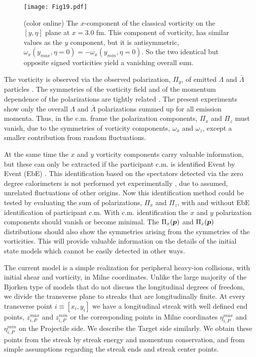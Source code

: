 \documentclass[aps,prc,twocolumn,floatfix,showpacs,a4paper,
nofootinbib,amsmath,amssymb]{revtex4-1}
\renewcommand{\vec}[1]{\mbox{\boldmath$#1$}}
\begin{document}
\begin{figure}[htb]     %
\begin{center}
\resizebox{1.01\columnwidth}{!}
{\texttt{[image: Fig19.pdf]}}
\caption{ (color online)
The $x$-component of the classical vorticity
on the $[y,\eta]$ plane at $x=3.0$ fm. This component of vorticity,
has similar values as the $y$ component, but it is 
antisymmetric, 
$\omega_x(y_{max}, \eta=0) = - \omega_x(y_{min}, \eta=0)$.
So the two identical but opposite signed vorticities
yield a vanishing overall sum.
}
\label{vort_x}
\end{center}
\end{figure}        %

The vorticity is observed via the observed polarization, $\Pi_y$, of emitted 
$\Lambda$ and $\bar{\Lambda}$ particles 
\cite{Bec13,Erratum,BCDG13}. The symmetries of the vorticity field and
of the momentum dependence of the polarizations are tightly
related \cite{BCDG13}. The present experiments show only the overall
$\Lambda$ and $\bar{\Lambda}$ polarizations summed up for all emission
momenta. Thus, in the c.m. frame the polarization components,
$\Pi_x$  and $\Pi_z$ must vanish, 
due to the symmetries of vorticity components,
$\omega_x$ and $\omega_z$,
except a smaller contribution from random fluctuations.

At the same time the $x$ and $y$ vorticity components carry valuable
information, but these can only be extracted if the participant 
c.m. is identified Event by Event (EbE)
\cite{Eyyubova,CseStoe2014}.
This identification based on the spectators detected via the
zero degree calorimeters is not performed yet experimentally
\cite{Schukraft},
due to assumed, unrelated fluctuations of other origins.
Now this identification method could be tested by evaluating the
sum of polarizations, $\Pi_x$  and $\Pi_z$, with and without
EbE identification of participant c.m. 
With c.m. identification the $x$ and $y$ polarization components
should vanish or become minimal. The
$\Pi_x(\vec{p})$  and $\Pi_z(\vec{p})$ distributions 
should also show the 
symmetries arising from the symmetries of the vorticities.
This will provide valuable information on the details of the
initial state models which cannot be easily detected in other 
ways.

The current model is a simple realization for peripheral
heavy-ion collisions, with initial shear and vorticity,
in Milne coordinates. Unlike the large majority of the 
Bjorken type of models that do not discuss the longitudinal
degrees of freedom, we divide the transverse plane to streaks
that are longitudinally finite. At every transverse
point $i \equiv [x_i,y_i]$ we have a longitudinal streak 
with well defined end points, 
$z^{max}_{i,P}$ and $z^{min}_{i,P}$ or the corresponding
points in Milne coordinates
$\eta^{max}_{i,P}$ and $\eta^{min}_{i,P}$ on the Projectile
side. We describe the Target side similarly. We obtain these
points from the streak by streak energy and momentum conservation,
and from simple assumptions regarding the streak ends and
streak center points.
  
\end{document}
